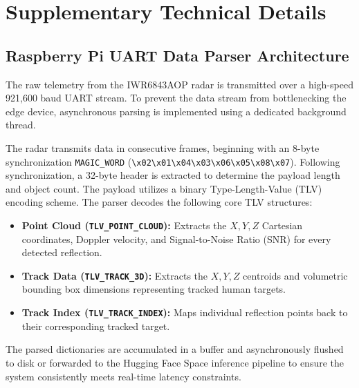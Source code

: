 \chapter{Supplementary Technical Details}
\section{Raspberry Pi UART Data Parser Architecture}

The raw telemetry from the IWR6843AOP radar is transmitted over a high-speed 921,600 baud UART stream. To prevent the data stream from bottlenecking the edge device, asynchronous parsing is implemented using a dedicated background thread.

The radar transmits data in consecutive frames, beginning with an 8-byte synchronization \texttt{MAGIC\_WORD} (\verb|\x02\x01\x04\x03\x06\x05\x08\x07|). Following synchronization, a 32-byte header is extracted to determine the payload length and object count. The payload utilizes a binary Type-Length-Value (TLV) encoding scheme. The parser decodes the following core TLV structures:

\begin{itemize}
    \item \textbf{Point Cloud (\texttt{TLV\_POINT\_CLOUD}):} Extracts the $X, Y, Z$ Cartesian coordinates, Doppler velocity, and Signal-to-Noise Ratio (SNR) for every detected reflection.
    \item \textbf{Track Data (\texttt{TLV\_TRACK\_3D}):} Extracts the $X, Y, Z$ centroids and volumetric bounding box dimensions representing tracked human targets.
    \item \textbf{Track Index (\texttt{TLV\_TRACK\_INDEX}):} Maps individual reflection points back to their corresponding tracked target.
\end{itemize}

The parsed dictionaries are accumulated in a buffer and asynchronously flushed to disk or forwarded to the Hugging Face Space inference pipeline to ensure the system consistently meets real-time latency constraints.